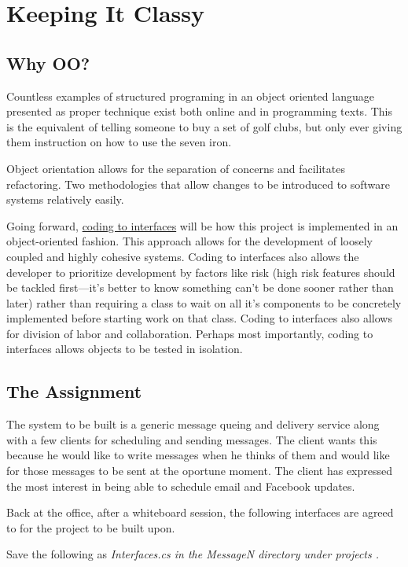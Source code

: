 
\chapter{Keeping It Classy}

\section{Why OO?}
Countless examples of structured programing in an object oriented language presented as proper technique exist both online and in programming texts. This is the equivalent of telling someone to buy a set of golf clubs, but only ever giving them instruction on how to use the seven iron.

Object orientation allows for the separation of concerns and facilitates refactoring. Two methodologies that allow changes to be introduced to software systems relatively easily.

Going forward, \href{http://www.javaworld.com/javaworld/jw-08-1999/jw-08-interfaces.html}{coding to interfaces} will be how this project is implemented in an object-oriented fashion. This approach allows for the development of loosely coupled and highly cohesive systems. Coding to interfaces also allows the developer to prioritize development by factors like risk (high risk features should be tackled first---it's better to know something can't be done sooner rather than later) rather than requiring a class to wait on all it's components to be concretely implemented before starting work on that class. Coding to interfaces also allows for division of labor and collaboration. Perhaps most importantly, coding to interfaces allows objects to be tested in isolation.

\section{The Assignment}
The system to be built is a generic message queing and delivery service along with a few clients for scheduling and sending messages. The client wants this because he would like to write messages when he thinks of them and would like for those messages to be sent at the oportune moment. The client has expressed the most interest in being able to schedule email and Facebook updates.

Back at the office, after a whiteboard session, the following interfaces are agreed to for the project to be built upon.

Save the following as \em Interfaces.cs \em in the \em MessageN \em directory under \em projects \em.

